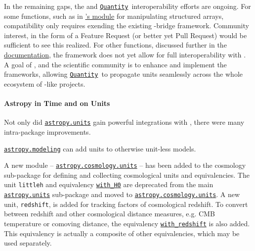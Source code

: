 \documentclass[modern]{aastex631}
\newcommand{\astropysubpkg}[1]{\href{http://docs.astropy.org/en/stable/#1/index.html}{\texttt{astropy.#1}}\xspace}
\newcommand{\astropycosmologyunits}{\href{https://docs.astropy.org/en/stable/cosmology/units.html}{\texttt{astropy.cosmology.units}}}
\newcommand{\astropyunits}{\astropysubpkg{units}}
\newcommand{\astropymodeling}{\astropysubpkg{modeling}}
\newcommand{\astropyapi}[2]{\href{https://docs.astropy.org/en/stable/api/astropy.#1.html}{#2}}
\newcommand{\astropyapidoc}[2]{\astropyapi{#1}{\texttt{#2}\xspace}}
\newcommand{\astropyQuantity}{\astropyapidoc{units.Quantity}{Quantity}}
\begin{document}
    In the remaining gaps, the  and \astropyQuantity\
    interoperability efforts are ongoing. For some functions, such as in
    \href{https://numpy.org/doc/stable/user/basics.rec.html#module-numpy.lib.recfunctions}{'s
    module} for manipulating structured arrays, compatibility only requires
    exending the existing \package{numpy}-\astropypkg bridge framework.
    Community interest, in the form of a Feature Request (or better yet Pull
    Request) would be sufficient to see this realized. For other functions,
    discussed further in the
    \href{https://docs.astropy.org/en/stable/known_issues.html#known-deficiencies}{\astropy
    documentation}, the \package{numpy} framework does not yet allow for full
    interoperability with \astropy. A goal of \astropy, and the scientific
    \python community is to enhance and implement the frameworks, allowing
    \astropyQuantity\ to propagate units seamlessly across the whole ecosystem of
    \package{numpy}-like projects.

  \paragraph{Astropy in Time and on Units}

    Not only did \astropyunits gain powerful integrations with ,
    there were many intra-package improvements.

    \astropymodeling can add units to otherwise unit-less models.

    A new module –
    \astropycosmologyunits
    – has been added to the cosmology sub-package for defining and collecting
    cosmological units and equivalencies. The unit \texttt{littleh} and
    equivalency
    \astropyapidoc{cosmology.units.with_H0}{with\_H0}
    are deprecated from the main \astropyunits sub-package and moved to
    \astropycosmologyunits. A new unit, \texttt{redshift}, is added for tracking
    factors of cosmological redshift.
    To convert between redshift and other cosmological distance
    measures, e.g. CMB temperature or comoving distance, the equivalency
    \astropyapidoc{cosmology.units.with_redshift}{with\_redshift}
    is also added. This equivalency is actually a composite of other
    equivalencies,
    which may be used separately.
\end{document}
